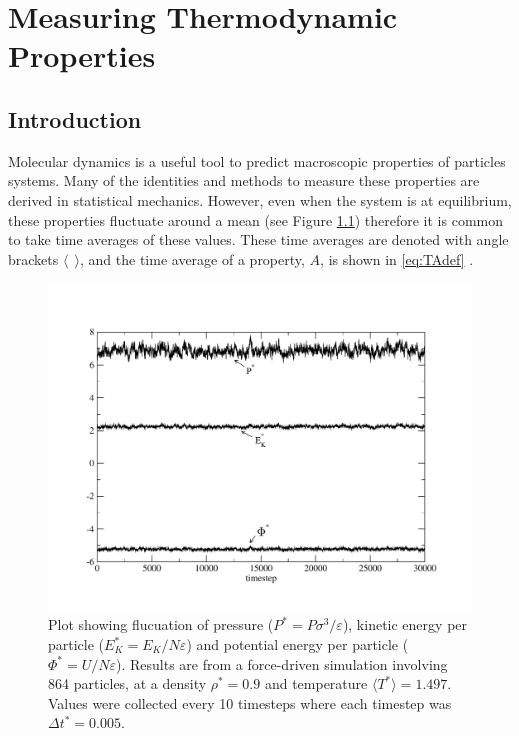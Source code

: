 \documentclass[12pt]{UoAthesis}
\begin{document}
\newpage

\chapter{Measuring Thermodynamic Properties}
\section{Introduction}
Molecular dynamics is a useful tool to predict macroscopic properties
of particles systems.  Many of the identities and methods to measure
these properties are derived in statistical mechanics.  However, even
when the system is at equilibrium, these properties fluctuate around a
mean (see Figure \ref{fig:fluctuations}) therefore it is common to
take time averages of these values. These time averages are denoted
with angle brackets $\langle\:\: \rangle$, and the time average of a
property, $A$, is shown in \eqref{eq:TAdef} \cite{Haile1997}.

\begin{figure}[htp] 
  \begin{center}
    \includegraphics[clip,width=\textwidth]{figures/energyplot} 
    \caption{\label{fig:fluctuations} Plot showing flucuation of pressure
      ($P^*=P\sigma^3/\varepsilon$), kinetic energy per particle
      ($E_K^*=E_K/N\varepsilon$) and potential energy per particle
      ($\Phi^*=U/N\varepsilon$).  Results are from a force-driven simulation
      involving 864 particles, at a density $\rho^*=0.9$ and
      temperature $\langle T^*\rangle=1.497$. Values were collected
      every 10 timesteps where each timestep was $\Delta t^* = 0.005$.}
  \end{center}
\end{figure}
\end{document}
